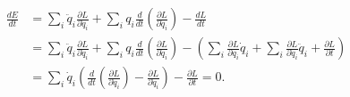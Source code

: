 \documentclass[a4paper,12pt]{report}
\begin{document}
\begin{equation}
	\begin{aligned} 
	\frac{dE}{dt} &= \sum_{i}^{}  \ddot{q} _{i} \frac{\partial L}{\partial \dot{q}_{i}  }  + \sum_{i}^{} q_{i} \frac{d}{dt} \left( \frac{\partial L}{\partial \dot{q}_{i}  } \right)   - \frac{dL}{dt} \\
	&= \sum_{i}^{}  \ddot{q} _{i} \frac{\partial L}{\partial \dot{q}_{i}  }  + \sum_{i}^{} q_{i} \frac{d}{dt} \left( \frac{\partial L}{\partial \dot{q}_{i}  } \right) - \left( \sum_{i}^{} \frac{\partial L}{\partial q_{i} } \dot{q}_{i}  + \sum_{i}^{} \frac{\partial L}{\partial \dot{q}_{i} } \ddot{q}_{i}  + \frac{\partial L}{\partial t}     \right) \\
	&= \sum_{i}^{} \dot{q} _{i} \left( \frac{d}{dt} \left( \frac{\partial L}{\partial \dot{q} _{i} }   \right) - \frac{\partial L}{\partial \dot{q}_{i}  }  \right) - \frac{\partial L}{\partial t} = 0.
	\end{aligned} 
\end{equation}
\end{document}
